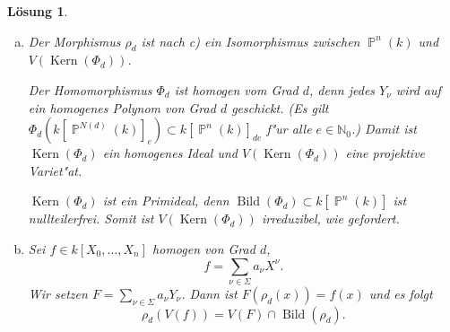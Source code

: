 \documentclass[a4paper, 12pt, numbers=noendperiod, chapterprefix=true]{scrbook}
\theoremstyle{break}
\newtheorem{Loes}{L\"osung}
\theoremstyle{nonumberbreak}
\theoremstyle{nonumberplain}
\DeclareMathOperator{\Bild}{Bild}
\DeclareMathOperator{\id}{id}
\DeclareMathOperator{\Kern}{Kern}
\newcommand{\N}{\mathbb{N}}
\newcommand{\A}{\mathbb{A}}
\DeclareMathOperator{\Projective}{\mathbb{P}} %
\begin{document}
\begin{Loes}
\begin{enumerate}[a)]
	Als n"achstes zeigen wir $\rho_d\circ \psi_d^0 = \id_{U_0}$. Dazu brauchen wir noch eine weitere Relation. F"ur $\nu\in\Sigma$ ist
	\begin{align*}
		\Phi_d({Y_{(d,0,\dots,0)}}^{\nu_0}{Y_{(d-1,1,0,\dots,0)}}^{\nu_1} \cdots {Y_{(d-1,0,\dots,0,1)}}^{\nu_n}) &= X_0^{d\nu_0}X_0^{(d-1)\nu_1}X_1^{\nu_1}\cdots X_0^{(d-1)\nu_n}X_n^{\nu_n}\\
		&= X_0^{(d-1)\sum_{i=0}^n\nu_i}X_0^{\nu_0}X_1^{\nu_1}\cdots X_n^{\nu_n}\\
		&= X_0^{(d-1)d}X^\nu\\
		&= \Phi_d(Y_\nu)\Phi_d({Y_{(d,0,\dots,0)}}^{(d-1)}).
	\end{align*}
	Das bedeutet: F"ur alle $\nu\in \Sigma$ gilt
		\[{Y_{(d,0,\dots,0)}}^{\nu_0}{Y_{(d-1,1,0,\dots,0)}}^{\nu_1} \cdots {Y_{(d-1,0,\dots,0,1)}}^{\nu_n} - Y_{\nu}{Y_{(d,0,\dots,0)}}^{(d-1)}  \in \Kern(\Phi_d).\]
	Damit folgt f"ur $y\in U_0$, d.h. $y_{(d,0,\dots,0)} \neq 0$,
	\begin{align*}
		\rho_d\circ \psi_d^0(y) &= \rho_d(y_{(d,0,\dots,0)}: y_{(d-1,1,0,\dots,0)} : \ldots : y_{(d-1,0,\dots,0,1)})\\
		&= (\ldots : {y_{(d,0,\dots,0)}}^{\nu_0} {y_{(d-1,1,0,\dots,0)}}^{\nu_1} \cdots {y_{(d-1,0,\dots,0,1)}}^{\nu_n}: \ldots)\\
		&= (\ldots : y_\nu {y_{(d,0,\dots,0)}}^{(d-1)}:\ldots ) \stackrel{y_{(d,0,\dots,0)} \neq 0}{=} y.
	\end{align*}
	Auf $U_i\cap U_j$ sind $\psi_d^i$ und $\psi_d^j$ beides Umkehrabbildungen zu $\rho_d$. Wegen der Eindeutigkeit der Umkehrabbildung gilt f"ur alle $y\in U_i\cap U_j$
		\[\psi_d^i(y) = \psi_d^j(y).\]
	Damit verkleben sich die $\psi_d^i$ zu einem Morphismus
		\[\psi_d : V(\Kern(\Phi_d)) \to \Projective^n,\]
	der ein Umkehrmorphismus zu $\rho_d$ ist.
\item[d)]
	Der Morphismus $\rho_d$ ist nach c) ein Isomorphismus zwischen $\Projective^n(k)$ und $V(\Kern(\Phi_d))$.

	Der Homomorphismus $\Phi_d$ ist homogen vom Grad $d$, denn jedes $Y_\nu$ wird auf ein homogenes Polynom von Grad $d$ geschickt. (Es gilt $\Phi_d(k[\Projective^{N(d)}(k)]_e) \subset k[\Projective^n(k)]_{de}$ f"ur alle $e\in \N_0$.) Damit ist $\Kern(\Phi_d)$ ein homogenes Ideal und $V(\Kern(\Phi_d))$ eine projektive Variet"at.

	$\Kern(\Phi_d)$ ist ein Primideal, denn $\Bild(\Phi_d)\subset k[\Projective^n(k)]$ ist nullteilerfrei. Somit ist $V(\Kern(\Phi_d))$ irreduzibel, wie gefordert. 

\item[e)]
	Sei $f\in k[X_0,\dots,X_n]$ homogen von Grad $d$,
		\[f = \sum_{\nu\in \Sigma} a_\nu X^\nu.\]
	Wir setzen $F = \sum_{\nu\in \Sigma} a_{\nu} Y_\nu$. Dann ist $F(\rho_d(x)) = f(x)$ und es folgt
		\[\rho_d(V(f)) =  V(F)\cap \Bild(\rho_d).\]
\end{enumerate}\end{Loes}
\end{document}
